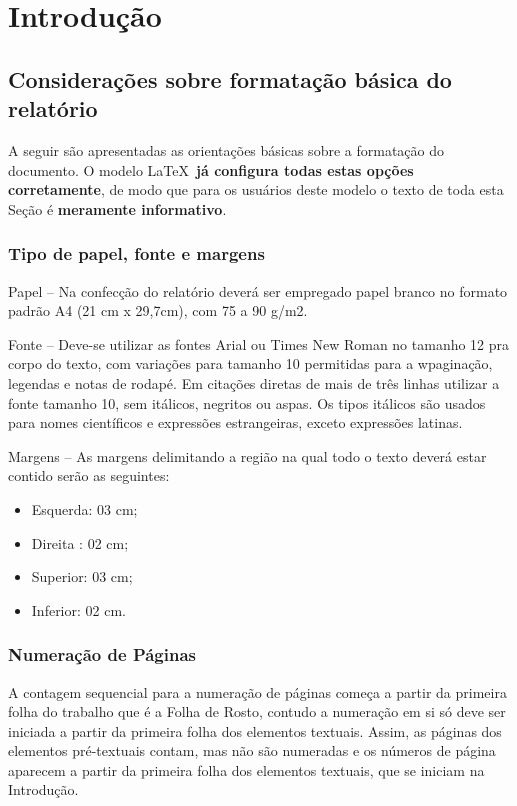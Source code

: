 \chapter[Introdução]{Introdução}

\section{Considerações sobre formatação básica do relatório}

A seguir são apresentadas as orientações básicas sobre a formatação do
documento. O modelo \LaTeX\ \textbf{já configura todas estas opções corretamente},
de modo que para os usuários deste modelo o texto de toda esta Seção é 
\textbf{meramente informativo}.

\subsection{Tipo de papel, fonte e margens}

Papel -- Na confecção do relatório deverá ser empregado papel branco no 
formato padrão A4 (21 cm x 29,7cm), com 75 a 90 g/m2.

Fonte -- Deve-se utilizar as fontes Arial ou Times New Roman no tamanho 12 
pra corpo do texto, com variações para tamanho 10 permitidas para a 
wpaginação, legendas e notas de rodapé. Em citações diretas de mais de três 
linhas utilizar a fonte tamanho 10, sem itálicos, negritos ou aspas. Os 
tipos itálicos são usados para nomes científicos e expressões estrangeiras, 
exceto expressões latinas.

Margens -- As margens delimitando a região na qual todo o texto deverá estar 
contido serão as seguintes: 

\begin{itemize}
	\item Esquerda: 03 cm;
	\item Direita	: 02 cm;
	\item Superior: 03 cm;
	\item Inferior: 02 cm. 
\end{itemize}

\subsection{Numeração de Páginas}

A contagem sequencial para a numeração de páginas começa a partir da 
primeira folha do trabalho que é a Folha de Rosto, contudo a numeração em 
si só deve ser iniciada a partir da primeira folha dos elementos textuais. 
Assim, as páginas dos elementos pré-textuais contam, mas não são numeradas 
e os números de página aparecem a partir da primeira folha dos elementos 
textuais, que se iniciam na Introdução. 

